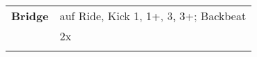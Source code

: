 \begin{tabular}{p{1.6cm}l}
	\textbf{Bridge} & auf Ride, Kick 1, 1+, 3, 3+; Backbeat           \\
	                & 2x                                              \\
	                &                                                 \\
\end{tabular}

